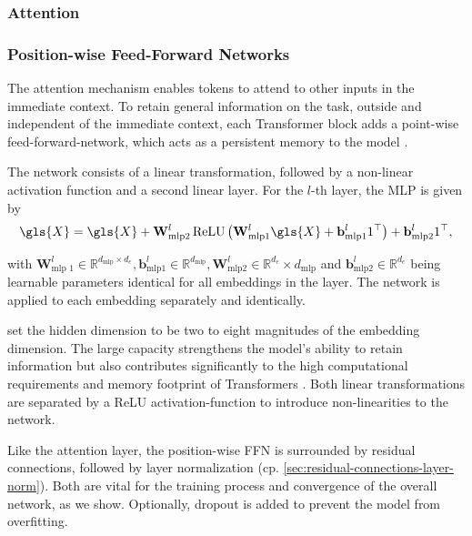 \subsubsection{Attention}\label{sec:attention}

\subsubsection{Position-wise Feed-Forward Networks}\label{sec:position-wise-ffn}

The attention mechanism enables tokens to attend to other inputs in the immediate context. To retain general information on the task, outside and independent of the immediate context, each Transformer block adds a point-wise \gls{feed-forward-network}, which acts as a persistent memory to the model \autocite[][3]{sukhbaatarAugmentingSelfattentionPersistent2019}.

The network consists of a linear transformation, followed by a non-linear activation function and a second linear layer. For the $l$-th layer, the \gls{MLP} is given by
\begin{equation}
    \gls{X} = \gls{X}+\mathbf{W}_{\mathrm{mlp} 2}^l \operatorname{ReLU}\left(\mathbf{W}_{\mathrm{mlp} 1}^l \gls{X}+\mathbf{b}_{\mathrm{mlp} 1}^l 1^{\top}\right)+\mathbf{b}_{\mathrm{mlp} 2}^l 1^{\top},
\end{equation}

with $\mathbf{W}_{\text {mlp } 1}^l \in \mathbb{R}^{d_{\mathrm{mlp}} \times d_{e}}, \mathbf{b}_{\mathrm{mlp} 1}^l \in \mathbb{R}^{d_{\mathrm{mlp}}}, \mathbf{W}_{\mathrm{mlp} 2}^l \in \mathbb{R}^{d_{e}} \times d_{\mathrm{mlp}}$ and $\mathbf{b}_{\mathrm{mlp} 2}^l \in \mathbb{R}^{d_{e}}$ being learnable parameters identical for all \glspl{embedding} in the layer. The network is applied to each embedding separately and identically.

\textcite[][9]{vaswaniAttentionAllYou2017} set the hidden dimension to be two to eight magnitudes of the embedding dimension. The large capacity strengthens the model's ability to retain information but also contributes significantly to the high computational requirements and memory footprint of Transformers \autocites[][5]{tayEfficientTransformersSurvey2022}[][1]{kitaevReformerEfficientTransformer2020}. Both linear transformations are separated by a \gls{ReLU} \gls{activation-function} \autocite[][318]{glorotDeepSparseRectifier2011} to introduce non-linearities to the network.

Like the attention layer, the position-wise \gls{FFN} is surrounded by residual connections, followed by layer normalization (cp. \cref{sec:residual-connections-layer-norm}). Both are vital for the training process and convergence of the overall network, as we show. Optionally, dropout \autocite[][1930]{srivastavaDropoutSimpleWay} is added to prevent the model from \gls{overfitting}.

